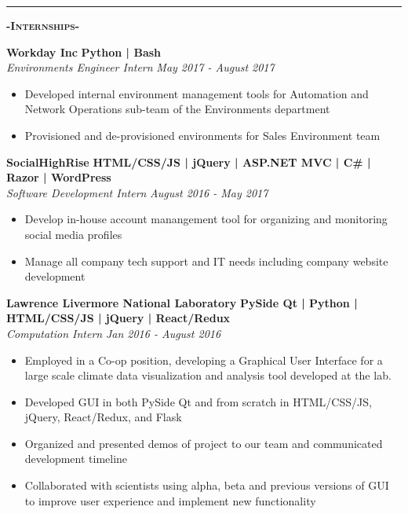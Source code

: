 \documentclass[12pt]{article}
\begin{document}
\noindent\rule{19cm}{0.4pt}

\center
\color{black}
\color{black}
\begin{center}
\textbf{\textsc{-Internships-}}\\
\end{center}
\begin{footnotesize}
\flushleft
\color{Cerulean}\textbf{Workday Inc}\hfill \color{TealBlue} \textbf{Python | Bash} \\ 
\color{Black}\textit{Environments Engineer Intern} \hfill \textit{May 2017 - August 2017}
\color{black}
\begin{itemize}
    \setlength{\itemsep}{0pt}
	\item Developed internal environment management tools for Automation and Network Operations sub-team of the Environments department
	\item Provisioned and de-provisioned environments for Sales Environment team
\end{itemize}
\color{Cerulean}\textbf{SocialHighRise}\hfill \color{TealBlue} \textbf{HTML/CSS/JS | jQuery | ASP.NET MVC | C\# | Razor | WordPress } \\ \color{Black}\textit{Software Development Intern} \hfill \textit{August 2016 - May 2017}
\color{black}
\begin{itemize}
    \setlength{\itemsep}{0pt}
	\item Develop in-house account manangement tool for organizing and monitoring social media profiles
	\item Manage all company tech support and IT needs including company website development
\end{itemize}
\color{Cerulean}\textbf{Lawrence Livermore National Laboratory} \color{Black} \hfill
\color{TealBlue} \textbf{PySide Qt | Python | HTML/CSS/JS | jQuery | React/Redux}\\
\color{Black} \textit{Computation Intern} \hfill\textit{Jan 2016 - August 2016} 
\color{Black}
\begin{itemize}
    \setlength{\itemsep}{0pt}
	\item Employed in a Co-op position, developing a Graphical User Interface for a large scale climate data visualization and analysis tool developed at the lab.
	\item Developed GUI in both PySide Qt and from scratch in HTML/CSS/JS, jQuery, React/Redux, and Flask

	\item Organized and presented demos of project to our team and communicated development timeline
	\item Collaborated with scientists using alpha, beta and previous versions of GUI to improve user experience and implement new functionality
\end{itemize}

\end{footnotesize}
\end{document}
